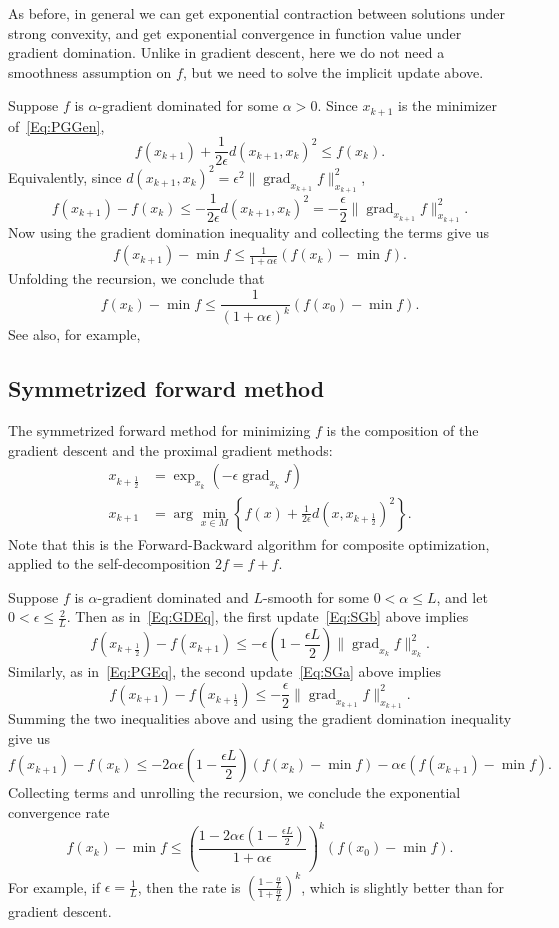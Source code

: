 \documentclass[final,12pt]{colt2018}
\DeclareMathOperator{\grad}{grad}
\begin{document}
As before, in general we can get exponential contraction between solutions under strong convexity, and get exponential convergence in function value under gradient domination.
Unlike in gradient descent, here we do not need a smoothness assumption on $f$, but we need to solve the implicit update above.

Suppose $f$ is $\alpha$-gradient dominated for some $\alpha > 0$.
Since $x_{k+1}$ is the minimizer of~\eqref{Eq:PGGen},
$$f(x_{k+1}) + \frac{1}{2\epsilon} d(x_{k+1},x_k)^2 \le f(x_k).$$
Equivalently, since $d(x_{k+1},x_k)^2 = \epsilon^2 \|\grad_{x_{k+1}} f\|^2_{x_{k+1}}$,
$$f(x_{k+1}) - f(x_k) \le -\frac{1}{2\epsilon} d(x_{k+1},x_k)^2 = -\frac{\epsilon}{2} \|\grad_{x_{k+1}} f\|^2_{x_{k+1}}.$$
Now using the gradient domination inequality and collecting the terms give us
\begin{align}\label{Eq:PGEq}
f(x_{k+1}) - \min f \le \frac{1}{1 + \alpha \epsilon} (f(x_k)-\min f).
\end{align}
Unfolding the recursion, we conclude that
$$f(x_k)-\min f \le \frac{1}{(1+\alpha \epsilon)^k} (f(x_0)-\min f).$$
See also, for example,~\cite[]{FO02,BEtAl16}


\subsection{Symmetrized forward method}

The symmetrized forward method for minimizing $f$ is the composition of the gradient descent and the proximal gradient methods:
\begin{subequations}
\begin{align}
x_{k+\frac{1}{2}} &= \exp_{x_k}(-\epsilon \grad_{x_k} f) \label{Eq:SGb} \\
x_{k+1} &= \arg\min_{x \in M} \left\{ f(x) + \frac{1}{2\epsilon} d(x,x_{k+\frac{1}{2}})^2 \right\}. \label{Eq:SGa}
\end{align}
\end{subequations}
Note that this is the Forward-Backward algorithm for composite optimization, applied to the self-decomposition $2f = f+f$.

Suppose $f$ is $\alpha$-gradient dominated and $L$-smooth for some $0 < \alpha \le L$, and let $0 < \epsilon \le \frac{2}{L}$.
Then as in~\eqref{Eq:GDEq}, the first update~\eqref{Eq:SGb} above implies
$$f(x_{k+\frac{1}{2}}) - f(x_{k+1}) \le  -\epsilon \left(1-\frac{\epsilon L}{2}\right) \|\grad_{x_k} f\|^2_{x_k}.$$
Similarly, as in~\eqref{Eq:PGEq}, the second update~\eqref{Eq:SGa} above implies
$$f(x_{k+1}) - f(x_{k+\frac{1}{2}}) \le -\frac{\epsilon}{2} \|\grad_{x_{k+1}} f\|^2_{x_{k+1}}.$$
Summing the two inequalities above and using the gradient domination inequality give us
$$f(x_{k+1})-f(x_k) \le -2\alpha \epsilon \left(1-\frac{\epsilon L}{2}\right)(f(x_k)-\min f) - \alpha \epsilon (f(x_{k+1})-\min f).$$
Collecting terms and unrolling the recursion, we conclude the exponential convergence rate
$$f(x_k)-\min f \le \left(\frac{1-2\alpha \epsilon \left(1-\frac{\epsilon L}{2}\right)}{1+\alpha \epsilon} \right)^k (f(x_0) - \min f).$$
For example, if $\epsilon = \frac{1}{L}$, then the rate is $\left(\frac{1-\frac{\alpha}{L}}{1+\frac{\alpha}{L}}\right)^k$, which is slightly better than for gradient descent.
\end{document}
